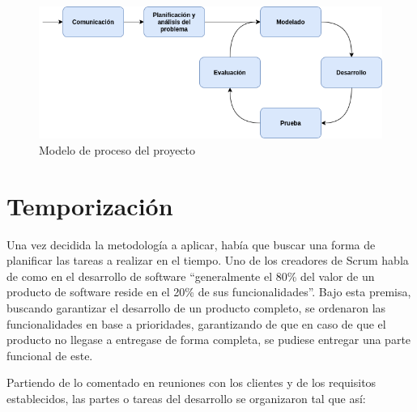 \begin{figure}[H]
    \centering
    \includegraphics[width=\textwidth]{diseno/modelo_de_proceso.png}
    \caption{Modelo de proceso del proyecto}
    \label{fig:modelo_de_proceso}
\end{figure}

\section{Temporización}

Una vez decidida la metodología a aplicar, había que buscar una forma de planificar las tareas a realizar en el tiempo. Uno de los creadores de Scrum habla de como en el desarrollo de software ``generalmente el 80\% del valor de un producto de software reside en el 20\% de sus funcionalidades''\cite{sutherland-2014}. Bajo esta premisa, buscando garantizar el desarrollo de un producto completo, se ordenaron las funcionalidades en base a prioridades, garantizando de que en caso de que el producto no llegase a entregase de forma completa, se pudiese entregar una parte funcional de este.

Partiendo de lo comentado en reuniones con los clientes y de los requisitos establecidos, las partes o tareas del desarrollo se organizaron tal que así: 

